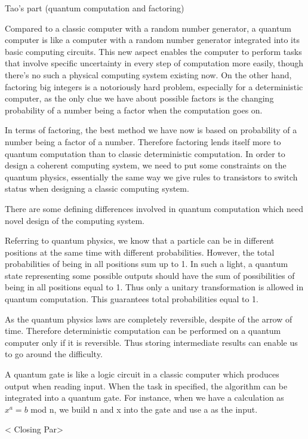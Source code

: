 \documentclass{paper}
\begin{document}
 Tao's part (quantum computation and factoring)

Compared to a classic computer with a random number generator, a 
quantum computer is like a computer with a random number generator 
integrated into its basic computing circuits. This new aspect enables 
the computer to perform tasks that involve specific uncertainty in every
step of computation more easily, though there's no such a physical 
computing system existing now. On the other hand, factoring big 
integers is a notoriously hard problem, especially for a deterministic 
computer, as the only clue we have about possible factors is the 
changing probability of a number being a factor when the computation 
goes on.

In terms of factoring, the best method we have now is based on 
probability of a number being a factor of a number. Therefore factoring
lends itself more to quantum computation than to classic deterministic
computation. In order to design a coherent computing system, we need to
put some constraints on the quantum physics, essentially the same way we
give rules to transistors to switch status when designing a classic 
computing system.

There are some defining differences involved in quantum computation
which need novel design of the computing system.

Referring to quantum physics, we know that a particle can be in 
different positions at the same time with different probabilities. 
However, the total probabilities of being in all positions sum up to 1. 
In such a light, a quantum state representing some possible outputs
should have the sum of possibilities of being in all positions equal to
1. Thus only a unitary transformation is allowed in quantum computation.
This guarantees total probabilities equal to 1.

As the quantum physics laws are completely reversible, despite of the
arrow of time. Therefore deterministic computation can be performed on
a quantum computer only if it is reversible. Thus storing intermediate
results can enable us to go around the difficulty.

A quantum gate is like a logic circuit in a classic computer which
produces output when reading input. When the task in specified, the
algorithm can be integrated into a quantum gate. For instance, when we
have a calculation as $x^a=b$ mod n, we build n and x into the gate and
use a as the input.


< Closing Par>
\end{document}
